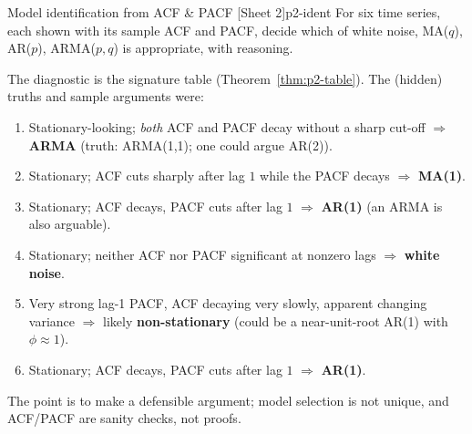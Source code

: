 \begin{exercise}{Model identification from ACF \& PACF \quad\textnormal{[Sheet 2]}}{p2-ident}
For six time series, each shown with its sample ACF and PACF, decide which of
white noise, MA($q$), AR($p$), ARMA($p,q$) is appropriate, with reasoning.
\end{exercise}
\begin{solution}
The diagnostic is the signature table (Theorem~\ref{thm:p2-table}). The (hidden)
truths and sample arguments were:
\begin{enumerate}
  \item Stationary-looking; \emph{both} ACF and PACF decay without a sharp
        cut-off $\Rightarrow$ \textbf{ARMA} (truth: ARMA(1,1); one could argue
        AR(2)).
  \item Stationary; ACF cuts sharply after lag $1$ while the PACF decays
        $\Rightarrow$ \textbf{MA(1)}.
  \item Stationary; ACF decays, PACF cuts after lag $1$ $\Rightarrow$
        \textbf{AR(1)} (an ARMA is also arguable).
  \item Stationary; neither ACF nor PACF significant at nonzero lags
        $\Rightarrow$ \textbf{white noise}.
  \item Very strong lag-1 PACF, ACF decaying very slowly, apparent changing
        variance $\Rightarrow$ likely \textbf{non-stationary} (could be a
        near-unit-root AR(1) with $\phi\approx1$).
  \item Stationary; ACF decays, PACF cuts after lag $1$ $\Rightarrow$
        \textbf{AR(1)}.
\end{enumerate}
The point is to make a defensible argument; model selection is not unique, and
ACF/PACF are sanity checks, not proofs.
\end{solution}

